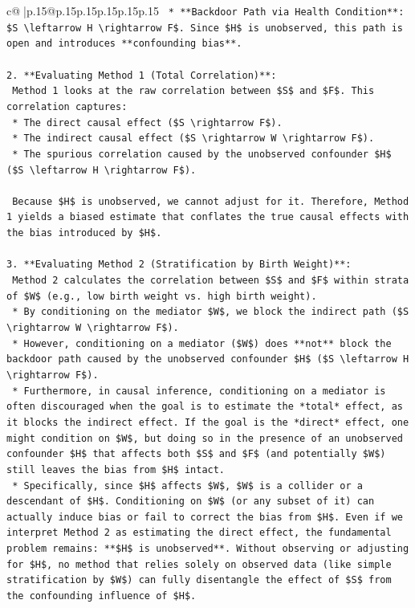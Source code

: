 \documentclass{article}
\begin{document}
{\begin{supertabular}{c@{$\;$}|p{.15\linewidth}@{}p{.15\linewidth}p{.15\linewidth}p{.15\linewidth}p{.15\linewidth}p{.15\linewidth}}
{{{\texttt{    *   **Backdoor Path via Health Condition**: \$S \textbackslash{}leftarrow H \textbackslash{}rightarrow F\$. Since \$H\$ is unobserved, this path is open and introduces **confounding bias**.} \\
\\ 
\texttt{2.  **Evaluating Method 1 (Total Correlation)**:} \\
\texttt{    Method 1 looks at the raw correlation between \$S\$ and \$F\$. This correlation captures:} \\
\texttt{    *   The direct causal effect (\$S \textbackslash{}rightarrow F\$).} \\
\texttt{    *   The indirect causal effect (\$S \textbackslash{}rightarrow W \textbackslash{}rightarrow F\$).} \\
\texttt{    *   The spurious correlation caused by the unobserved confounder \$H\$ (\$S \textbackslash{}leftarrow H \textbackslash{}rightarrow F\$).} \\
\\ 
\texttt{    Because \$H\$ is unobserved, we cannot adjust for it. Therefore, Method 1 yields a biased estimate that conflates the true causal effects with the bias introduced by \$H\$.} \\
\\ 
\texttt{3.  **Evaluating Method 2 (Stratification by Birth Weight)**:} \\
\texttt{    Method 2 calculates the correlation between \$S\$ and \$F\$ within strata of \$W\$ (e.g., low birth weight vs. high birth weight).} \\
\texttt{    *   By conditioning on the mediator \$W\$, we block the indirect path (\$S \textbackslash{}rightarrow W \textbackslash{}rightarrow F\$).} \\
\texttt{    *   However, conditioning on a mediator (\$W\$) does **not** block the backdoor path caused by the unobserved confounder \$H\$ (\$S \textbackslash{}leftarrow H \textbackslash{}rightarrow F\$).} \\
\texttt{    *   Furthermore, in causal inference, conditioning on a mediator is often discouraged when the goal is to estimate the *total* effect, as it blocks the indirect effect. If the goal is the *direct* effect, one might condition on \$W\$, but doing so in the presence of an unobserved confounder \$H\$ that affects both \$S\$ and \$F\$ (and potentially \$W\$) still leaves the bias from \$H\$ intact.} \\
\texttt{    *   Specifically, since \$H\$ affects \$W\$, \$W\$ is a collider or a descendant of \$H\$. Conditioning on \$W\$ (or any subset of it) can actually induce bias or fail to correct the bias from \$H\$. Even if we interpret Method 2 as estimating the direct effect, the fundamental problem remains: **\$H\$ is unobserved**. Without observing or adjusting for \$H\$, no method that relies solely on observed data (like simple stratification by \$W\$) can fully disentangle the effect of \$S\$ from the confounding influence of \$H\$.} \\
}}}
\end{supertabular}}
\end{document}
